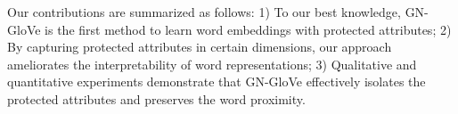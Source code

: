 Our contributions are summarized as follows: 1) To our best knowledge, GN-GloVe is the first method to learn word embeddings with protected attributes;
2) By capturing protected attributes in certain dimensions, our approach ameliorates the interpretability of word representations;
3) Qualitative and quantitative experiments demonstrate that GN-GloVe effectively isolates the protected attributes and preserves the word proximity. 






